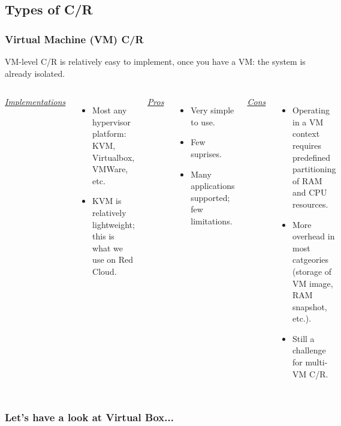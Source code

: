 \documentclass[compress]{beamer}
\begin{document}


\subsection{Types of C/R}   %



\begin{frame}
\frametitle{Virtual Machine (VM) C/R}
VM-level C/R is relatively easy to implement, once you have a VM: the
system is already isolated.
\begin{columns}[t]
\ul{\textit{Implementations}}
\begin{itemize}
\item Most any hypervisor platform: KVM, Virtualbox, VMWare, etc.
\item KVM is relatively lightweight; this is what we use on Red Cloud.
\end{itemize}

\ul{\textit{Pros}}
\begin{itemize}
\item Very simple to use.
\item Few suprises.
\item Many applications supported; few limitations.
\end{itemize}

\ul{\textit{Cons}}
\begin{itemize}
\item Operating in a VM context requires predefined partitioning of RAM and CPU
resources.
\item More overhead in most catgeories (storage of VM image, RAM snapshot, etc.).
\item Still a challenge for multi-VM C/R.
\end{itemize}

\end{columns}
\end{frame}
  

\begin{frame}
\frametitle{Let's have a look at Virtual Box...}

{}
{}

\end{frame}
\end{document}
